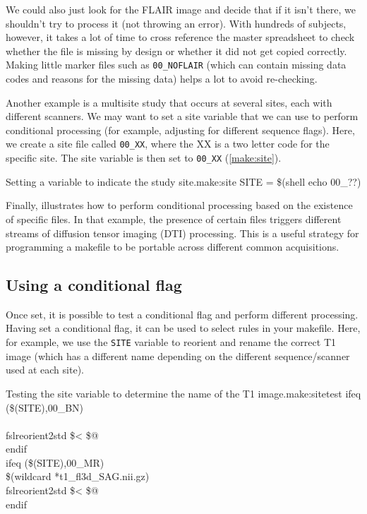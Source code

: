 We could also just look for the FLAIR image and decide that if it isn't there, we shouldn't try to process it (not throwing an error). With hundreds of subjects, however, it takes a lot of time to cross reference the master spreadsheet to check whether the file is missing by design or whether it did not get copied correctly. Making little marker files such as \texttt{00\_NOFLAIR} (which can contain missing data codes and reasons for the missing data) helps a lot to avoid re-checking.  

Another example is a multisite study that occurs at several sites, each with different scanners. We may want to set a site variable that we can use to perform conditional processing (for example, adjusting for different sequence flags). Here, we create a site file called \texttt{00\_XX}, where the XX is a two letter code for the specific site. The site variable is then set to \texttt{00\_XX} (\autoref{make:site}).

\begin{make}{Setting a variable to indicate the study site.}{make:site}
SITE = \$(shell echo 00\_??)
\end{make}

Finally,  illustrates how to perform conditional processing based on the existence of specific files. In that example, the presence of certain files triggers different streams of diffusion tensor imaging (DTI) processing. This is a useful strategy for programming a makefile to be portable across different common acquisitions. 

\subsection{Using a conditional flag}
Once set, it is possible to test a conditional flag and perform different processing. Having set a conditional flag, it can be used to select rules in your makefile. Here, for example, we use the \texttt{SITE} variable to reorient and rename the correct T1 image (which has a different name depending on the different sequence/scanner used at each site). 

\begin{make}{Testing the site variable to determine the name of the T1 image.}{make:sitetest}
ifeq (\$(SITE),00_BN) \\
\\
     \tab fslreorient2std \$< \$@    \\
endif \\

ifeq (\$(SITE),00_MR) \\
 {\$(wildcard *t1_fl3d_SAG.nii.gz)} \\
    \tab  fslreorient2std \$< \$@    \\
endif
\end{make}



